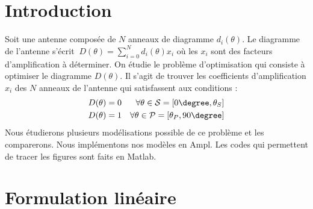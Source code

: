 \section*{Introduction}
Soit une antenne composée de $N$ anneaux de diagramme $d_i(\theta)$. Le diagramme de l'antenne s'écrit $\
D(\theta) = \sum_{i=0}^N d_i(\theta) x_i$ où les $x_i$ sont des facteurs d'amplification à déterminer. On étudie le problème d'optimisation qui consiste à optimiser le diagramme $D(\theta)$. Il s'agit de trouver les coefficients d'amplification $x_i$ des $N$ anneaux de l'antenne qui satisfassent aux conditions : 
\begin{align*}
D(\theta) &= 0  &\forall \theta \in \mathcal{S}=[0 \degree,\theta_S]\\
D(\theta) &= 1 &\forall \theta \in \mathcal{P}=[\theta_P, 90\degree]
\end{align*}
Nous étudierons plusieurs modélisations possible de ce problème et les comparerons. Nous implémentons nos modèles en Ampl. Les codes qui permettent de tracer les figures sont faits en Matlab.


\newpage
\section{Formulation linéaire}
